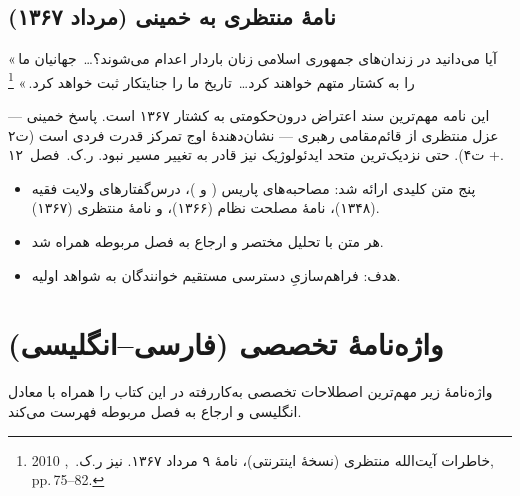 \section{نامهٔ منتظری به خمینی (مرداد ۱۳۶۷)}
\label{sec:app-b-montazeri}

\begin{warningBox}
«\,آیا می‌دانید در زندان‌های جمهوری اسلامی
زنان باردار اعدام می‌شوند؟\dots\
جهانیان ما را به کشتار متهم خواهند کرد\dots\
تاریخ ما را جنایتکار ثبت خواهد کرد.\,»%
\footnote{خاطرات آیت‌الله منتظری (نسخهٔ اینترنتی)،
نامهٔ ۹ مرداد ۱۳۶۷.
نیز ر.ک.\ \en{Robertson}, 2010, pp.\,75–82.}
\end{warningBox}

\begin{noteBox}
این نامه مهم‌ترین سند اعتراض درون‌حکومتی
به کشتار ۱۳۶۷ است.
پاسخ خمینی — عزل منتظری از قائم‌مقامی رهبری —
نشان‌دهندهٔ اوج تمرکز قدرت فردی است (ت‌۲ + ت‌۴).
حتی نزدیک‌ترین متحد ایدئولوژیک نیز
قادر به تغییر مسیر نبود.
ر.ک.\ فصل~۱۲.
\end{noteBox}

\begin{principleBox}
\begin{itemize}
\item پنج متن کلیدی ارائه شد:
      مصاحبه‌های پاریس ( و )،
      درس‌گفتارهای ولایت فقیه (۱۳۴۸)،
      نامهٔ مصلحت نظام (۱۳۶۶)،
      و نامهٔ منتظری (۱۳۶۷).
\item هر متن با تحلیل مختصر و ارجاع به فصل مربوطه همراه شد.
\item هدف: فراهم‌سازیِ دسترسی مستقیم خوانندگان
      به شواهد اولیه.
\end{itemize}
\end{principleBox}


\chapter{واژه‌نامهٔ تخصصی (فارسی–انگلیسی)}
\label{app:glossary}

\begin{infoBox}
واژه‌نامهٔ زیر مهم‌ترین اصطلاحات تخصصی به‌کاررفته
در این کتاب را همراه با معادل انگلیسی
و ارجاع به فصل مربوطه فهرست می‌کند.
\end{infoBox}

